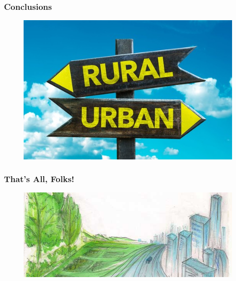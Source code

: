 \documentclass[20pt]{beamer}
\begin{document}
\begin{frame}
\frametitle{Conclusions}
\begin{figure}[H]    \centering
	{	 \includegraphics[width=\textwidth]{RuralUrban}}
\end{figure}
\end{frame}
\endgroup

\begin{frame}
\frametitle{That's All, Folks!}
\begin{figure}[H]    \centering
	{	 \includegraphics[width=\textwidth]{Sketch}}
\end{figure}
\end{frame}
\end{document}
